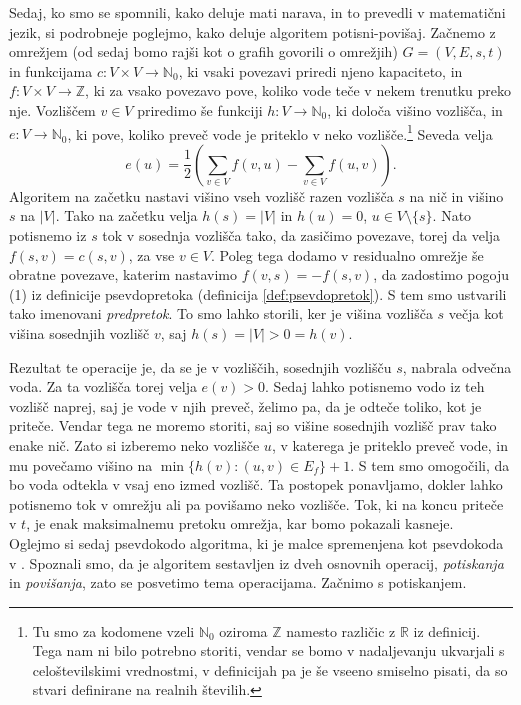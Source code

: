 \documentclass[mat1]{fmfdelo}
\newcommand{\R}{\mathbb R}
\newcommand{\N}{\mathbb N}
\newcommand{\Z}{\mathbb Z}
\begin{document}
Sedaj, ko smo se spomnili, kako deluje mati narava, in to prevedli v matematični jezik, si podrobneje poglejmo, kako deluje algoritem potisni-povišaj. Začnemo z omrežjem (od sedaj bomo rajši kot o grafih govorili o omrežjih) $G = (V, E, s, t)$ in funkcijama $c\colon V \times V \rightarrow \N_0$, ki vsaki povezavi priredi njeno kapaciteto, in $f\colon V \times V \rightarrow \Z$, ki za vsako povezavo pove, koliko vode teče v nekem trenutku preko nje. Vozliščem $v \in V$ priredimo še funkciji $h\colon V \rightarrow \N_0$, ki določa višino vozlišča, in $e\colon V \rightarrow \N_0$, ki pove, koliko preveč vode je priteklo v neko vozlišče.\footnote{Tu smo za kodomene vzeli $\N_0$ oziroma $\Z$ namesto različic z $\R$ iz definicij. Tega nam ni bilo potrebno storiti, vendar se bomo v nadaljevanju ukvarjali s celoštevilskimi vrednostmi, v definicijah pa je še vseeno smiselno pisati, da so stvari definirane na realnih številih.} Seveda velja \[e(u) = \frac{1}{2}\left(\sum_{v \in V} f(v,u) - \sum_{v \in V} f(u,v)\right).\] Algoritem na začetku nastavi višino vseh vozlišč razen vozlišča $s$ na nič in višino $s$ na $|V|$. Tako na začetku velja $h(s) = |V|$ in $h(u) = 0$, $u \in V \setminus \{s\}$. Nato potisnemo iz $s$ tok v sosednja vozlišča tako, da zasičimo povezave, torej da velja $f(s, v) = c(s, v)$, za vse $v \in V$. Poleg tega dodamo v residualno omrežje še obratne povezave, katerim nastavimo $f(v,s) = -f(s,v)$, da zadostimo pogoju (1) iz definicije psevdopretoka (definicija \ref{def:psevdopretok}). S tem smo ustvarili tako imenovani \textit{predpretok}. To smo lahko storili, ker je višina vozlišča $s$ večja kot višina sosednjih vozlišč $v$, saj $h(s) = |V| > 0 = h(v)$.

Rezultat te operacije je, da se je v vozliščih, sosednjih vozlišču $s$, nabrala odvečna voda. Za ta vozlišča torej velja $e(v) > 0$. Sedaj lahko potisnemo vodo iz teh vozlišč naprej, saj je vode v njih preveč, želimo pa, da je odteče toliko, kot je priteče. Vendar tega ne moremo storiti, saj so višine sosednjih vozlišč prav tako enake nič. Zato si izberemo neko vozlišče $u$, v katerega je priteklo preveč vode, in mu povečamo višino na $\min\{h(v) : (u,v) \in E_f\} + 1$. S tem smo omogočili, da bo voda odtekla v vsaj eno izmed vozlišč. Ta postopek ponavljamo, dokler lahko potisnemo tok v omrežju ali pa povišamo neko vozlišče. Tok, ki na koncu priteče v $t$, je enak maksimalnemu pretoku omrežja, kar bomo pokazali kasneje.\\

Oglejmo si sedaj psevdokodo algoritma, ki je malce spremenjena kot psevdokoda v \cite{clrs}. Spoznali smo, da je algoritem sestavljen iz dveh osnovnih operacij, \textit{potiskanja} in \textit{povišanja}, zato se posvetimo tema operacijama. Začnimo s potiskanjem.\\
\end{document}
